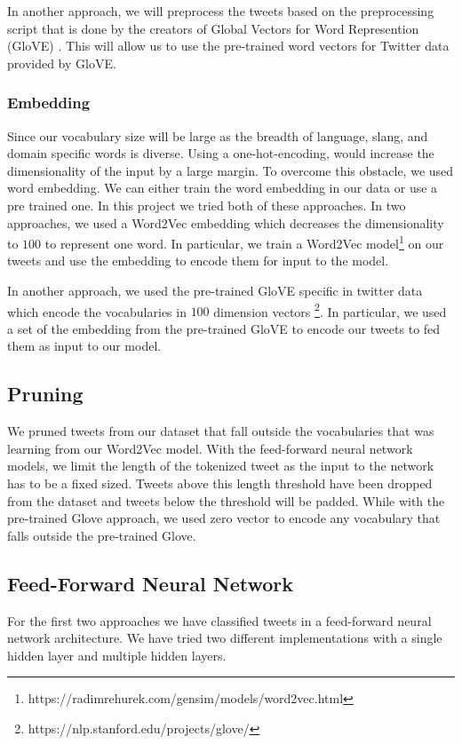 In another approach, we will preprocess the tweets based on the preprocessing script that is done by the creators of Global Vectors for Word Represention (GloVE) \citep{pennington-etal-2014-glove}. This will allow us to use the pre-trained word vectors for Twitter data provided by GloVE. 


\subsubsection{Embedding} Since our vocabulary size will be large as
the breadth of language, slang, and domain specific words is diverse.
Using a one-hot-encoding, would increase the dimensionality of the
input by a large margin. To overcome this obstacle, we used word embedding. We can either train the word embedding in our data or use a pre trained one. In this project we tried both of these approaches. In two approaches, we used a Word2Vec embedding \citep{Mikolov:2013:DRW:2999792.2999959} which decreases the dimensionality to $100$ to represent one word. In particular, we train a Word2Vec
model\footnote{https://radimrehurek.com/gensim/models/word2vec.html} on our tweets and use the embedding to encode them for input to the model. 

In another approach, we used the pre-trained GloVE specific in twitter data which encode the vocabularies in $100$ dimension vectors \footnote{https://nlp.stanford.edu/projects/glove/}. In particular, we used a set of the embedding from the pre-trained GloVE to encode our tweets to fed them as input to our model. 

\subsection{Pruning} We pruned tweets from our dataset that fall
outside the vocabularies that was learning from our Word2Vec model. With
the feed-forward neural network models, we limit the length of
the tokenized tweet as the input to the network has to be a fixed
sized. Tweets above this length threshold have been dropped from the
dataset and tweets below the threshold will be padded. While with the pre-trained Glove approach, we used zero vector to encode any vocabulary that falls outside the pre-trained Glove. 

\subsection{Feed-Forward Neural Network} For the first two approaches we have classified tweets in a feed-forward neural network
architecture. We have tried two different implementations with a single
hidden layer and multiple hidden layers.

